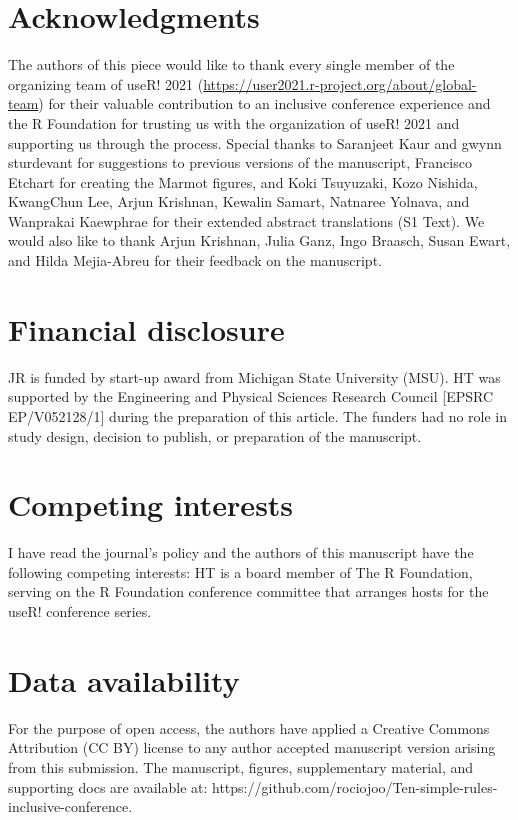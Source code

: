\documentclass[10pt,letterpaper]{article}
\begin{document}
\section*{Acknowledgments}
The authors of this piece would like to thank every single member of the organizing team of useR! 2021 (\url{https://user2021.r-project.org/about/global-team}) for their valuable contribution to an inclusive conference experience and the R Foundation for trusting us with the organization of useR! 2021 and supporting us through the process. Special thanks to Saranjeet Kaur and gwynn sturdevant for suggestions to previous versions of the manuscript, Francisco Etchart for creating the Marmot figures, and Koki Tsuyuzaki, Kozo Nishida, KwangChun Lee, Arjun Krishnan, Kewalin Samart, Natnaree Yolnava, and Wanprakai Kaewphrae for their extended abstract translations (S1 Text). We would also like to thank Arjun Krishnan, Julia Ganz, Ingo Braasch, Susan Ewart, and Hilda Mejia-Abreu for their feedback on the manuscript.


\section*{Financial disclosure}
JR is funded by start-up award from Michigan State University (MSU). HT was supported by the Engineering and Physical Sciences Research Council [EPSRC EP/V052128/1] during the preparation of this article.
The funders had no role in study design, decision to publish, or preparation of the manuscript.

\section*{Competing interests}
I have read the journal's policy and the authors of this manuscript have the following competing interests: HT is a board member of The R Foundation, serving on the R Foundation conference committee that arranges hosts for the useR! conference series.

\section*{Data availability}
For the purpose of open access, the authors have applied a Creative Commons Attribution (CC BY) license to any author accepted manuscript version arising from this submission. The manuscript, figures, supplementary material, and supporting docs are available at: https://github.com/rociojoo/Ten-simple-rules-inclusive-conference.
\end{document}
